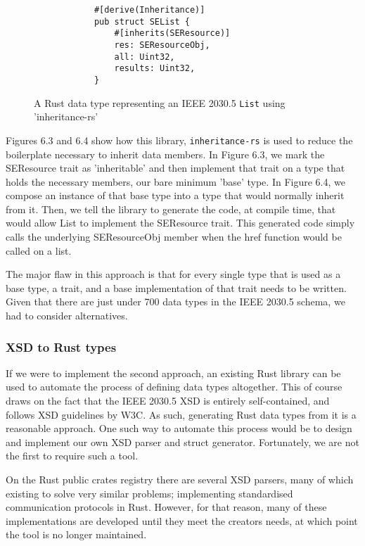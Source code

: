 \begin{figure}[H]
    \begin{center}
        \begin{lstlisting}
            #[derive(Inheritance)]
            pub struct SEList {
                #[inherits(SEResource)]
                res: SEResourceObj,
                all: Uint32,
                results: Uint32,
            }
        \end{lstlisting}
        \label{fig:listinher}
        \caption{A Rust data type representing an IEEE 2030.5 \texttt{List} using 'inheritance-rs'}
    \end{center}
\end{figure}


Figures 6.3 and 6.4 show how this library, \texttt{inheritance-rs} \cite[]{inheritancers} is used to reduce the boilerplate necessary to inherit data members. 
In Figure 6.3, we mark the SEResource trait as 'inheritable' and then implement that trait on a type that holds the necessary members, our bare minimum 'base' type. 
In Figure 6.4, we compose an instance of that base type into a type that would normally inherit from it. Then, we tell the library to generate the code, at compile time, that would allow List to implement the SEResource trait.
This generated code simply calls the underlying SEResourceObj member when the href function would be called on a list.

The major flaw in this approach is that for every single type that is used as a base type, a trait, and a base implementation of that trait needs to be written.
Given that there are just under 700 data types in the IEEE 2030.5 schema, we had to consider alternatives.


\subsubsection{XSD to Rust types}

If we were to implement the second approach, an existing Rust library can be used to automate the process of defining data types altogether.
This of course draws on the fact that the IEEE 2030.5 XSD is entirely self-contained, and follows XSD guidelines by W3C. As such, generating Rust data types from it is a reasonable approach.
One such way to automate this process would be to design and implement our own XSD parser and struct generator. Fortunately, we are not the first to require such a tool.

On the Rust public crates registry there are several XSD parsers, many of which existing to solve very similar problems; implementing standardised communication protocols in Rust.
However, for that reason, many of these implementations are developed until they meet the creators needs, at which point the tool is no longer maintained.

